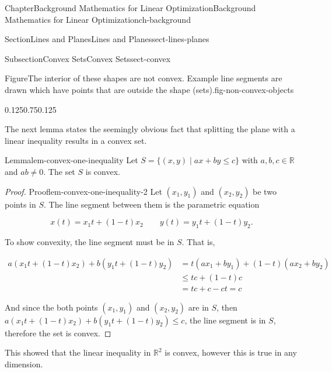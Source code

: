 \documentclass[oneside,10pt,]{book}
\numberwithin{equation}{section}
\newcommand{\amp}{&}
\begin{document}
\begin{chapterptx}{Chapter}{Background Mathematics for Linear Optimization}{}{Background Mathematics for Linear Optimization}{}{}{ch-background}
\begin{sectionptx}{Section}{Lines and Planes}{}{Lines and Planes}{}{}{sect-lines-planes}
\begin{subsectionptx}{Subsection}{Convex Sets}{}{Convex Sets}{}{}{sect-convex}
\begin{figureptx}{Figure}{The interior of these shapes are not convex.  Example line segments are drawn which have points that are outside the shape (sets).}{fig-non-convex-objects}{}%
\begin{image}{0.125}{0.75}{0.125}{}%
%
\end{image}%
\tcblower
\end{figureptx}%
The next lemma states the seemingly obvious fact that splitting the plane with a linear inequality results in a convex set.%
\begin{lemma}{Lemma}{}{}{lem-convex-one-inequality}%
Let \(S = \{ (x,y) \; | \; a x + b y \leq c \}\) with \(a, b, c \in \mathbb{R}\) and \(ab \neq 0\). The set \(S\) is convex.%
\end{lemma}
\begin{proof}{Proof}{}{lem-convex-one-inequality-2}
Let \((x_1, y_1)\) and \((x_2, y_2)\) be two points in \(S\). The line segment between them is the parametric equation%
\par
%
\begin{equation*}
x(t) = x_1 t + (1-t) x_2 \qquad y(t) = y_1 t + (1-t) y_2.
\end{equation*}
%
\par
To show convexity, the line segment must be in \(S\). That is,%
\par
%
\begin{align*}
a (x_1 t + (1-t) x_2) + b(y_1 t + (1-t)y_2) \amp = t (a x_1 + b y_1) + (1-t) (a x_2 + b y_2) \\
\amp \leq tc + (1-t) c \\
\amp = tc+c-ct = c
\end{align*}
%
\par
And since the both points \((x_1,y_1)\) and \((x_2, y_2)\) are in \(S\), then \(a (x_1 t + (1-t) x_2) + b(y_1 t + (1-t)y_2) \leq c\), the line segment is in \(S\), therefore the set is convex.%
\end{proof}
This showed that the linear inequality in \(\mathbb{R}^2\) is convex, however this is true in any dimension.%

\end{subsectionptx}
\end{sectionptx}
\end{chapterptx}
\end{document}
